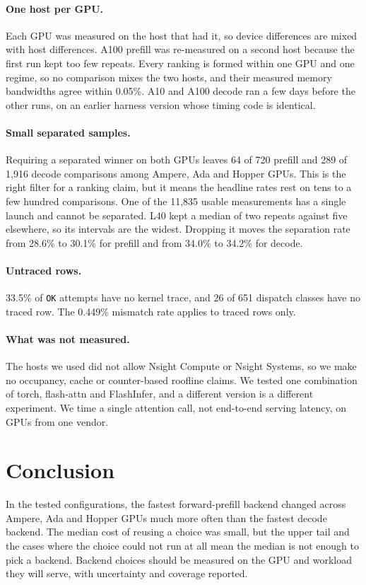 \documentclass[11pt]{article}
\newcommand{\code}[1]{\texttt{\small #1}}
\begin{document}
\paragraph{One host per GPU.} Each GPU was measured on the host that had it, so
device differences are mixed with host differences. A100 prefill was
re-measured on a second host because the first run kept too few repeats. Every
ranking is formed within one GPU and one regime, so no comparison mixes the two
hosts, and their measured memory bandwidths agree within 0.05\%. A10 and A100 decode ran a
few days before the other runs, on an earlier harness version whose timing
code is identical.

\paragraph{Small separated samples.} Requiring a separated winner on both GPUs
leaves 64 of 720 prefill and 289 of 1{,}916 decode comparisons among Ampere, Ada
and Hopper GPUs. This is the right filter for a ranking claim, but it means the
headline rates rest on tens to a few hundred comparisons. One of the 11{,}835
usable measurements has a single launch and cannot be separated. L40 kept a
median of two repeats against five elsewhere, so its intervals are the widest.
Dropping it moves the separation rate from 28.6\% to 30.1\% for prefill and from
34.0\% to 34.2\% for decode.

\paragraph{Untraced rows.} 33.5\% of \code{OK} attempts have no kernel trace,
and 26 of 651 dispatch classes have no traced row. The 0.449\% mismatch rate
applies to traced rows only.

\paragraph{What was not measured.} The hosts we used did not allow Nsight
Compute or Nsight Systems, so we make no occupancy, cache or counter-based
roofline claims. We tested one combination of torch, flash-attn and FlashInfer,
and a different version is a different experiment. We time a single attention
call, not end-to-end serving latency, on GPUs from one vendor.

\section{Conclusion}

In the tested configurations, the fastest forward-prefill backend changed
across Ampere, Ada and Hopper GPUs much more often than the fastest decode
backend. The median cost of reusing a choice was small, but the upper tail and
the cases where the choice could not run at all mean the median is not enough
to pick a backend. Backend choices should be measured on the GPU and workload
they will serve, with uncertainty and coverage reported.


\end{document}
